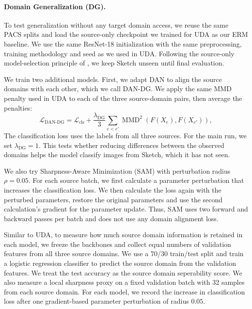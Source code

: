 \documentclass{article}
\begin{document}
\paragraph{Domain Generalization (DG).}\mbox{}\par
To test generalization without any target domain access, we reuse the same PACS splits and load the source-only checkpoint we trained for UDA as our ERM baseline. We use the same ResNet-18 initialization with the same preprocessing, training methodology and seed as we used in UDA. Following the source-only model-selection principle of \citet{gulrajani2021domainbed}, we keep Sketch unseen until final evaluation.

We train two additional models. First, we adapt DAN to align the source domains with each other, which we call DAN-DG. We apply the same MMD penalty used in UDA to each of the three source-domain pairs, then average the penalties:
  \[
  \mathcal{L}_{\text{DAN-DG}}
  =
  \mathcal{L}_{\text{cls}}
  +
  \frac{\lambda_{\text{DG}}}{3}
  \sum_{e<e'}
  \operatorname{MMD}^{2}\!\left(F(X_e),F(X_{e'})\right),
  \]
The classification loss uses the labels from all three sources. For the main run, we set $\lambda_{\text{DG}}=1$. This tests whether reducing differences between the observed domains helps the model classify images from Sketch, which it has not seen.

We also try Sharpness-Aware Minimization (SAM) \citep{foret2021sam} with perturbation radius $\rho=0.05$. For each source batch, we first calculate a parameter perturbation that increases the classification loss. We then calculate the loss again with the perturbed parameters, restore the original parameters and use the second calculation's gradient for the parameter update. Thus, SAM uses two forward and backward passes per batch and does not use any domain alignment loss.

Similar to UDA, to measure how much source domain information is retained in each model, we freeze the backbones and collect equal numbers of validation features from all three source domains. We use a 70/30 train/test split and train a logistic regression classifier to predict the source domain from the validation features. We treat the test accuracy as the source domain seperability score. We also measure a local sharpness proxy on a fixed validation batch with 32 samples from each source domain. For each  model, we record the increase in classification loss after one gradient-based parameter perturbation of radius $0.05$.
\end{document}
